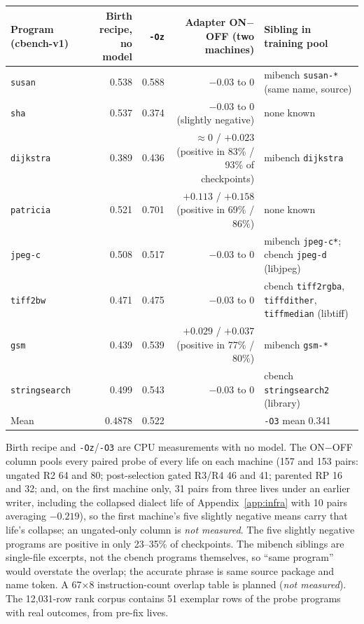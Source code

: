 \documentclass{article}
\newcommand{\onoff}{ON$-$OFF}
\newcommand{\nm}{\emph{not measured}}
\begin{document}
\begin{center}\small
\begin{tabular}{lrrrl}
\toprule
Program (cbench-v1) & Birth recipe, no model & \texttt{-Oz} & Adapter \onoff{} (two machines) & Sibling in training pool \\
\midrule
\texttt{susan} & 0.538 & 0.588 & $-0.03$ to 0 & mibench \texttt{susan-*} (same name, source) \\
\texttt{sha} & 0.537 & 0.374 & $-0.03$ to 0 (slightly negative) & none known \\
\texttt{dijkstra} & 0.389 & 0.436 & $\approx 0$ / $+0.023$ (positive in 83\% / 93\% of checkpoints) & mibench \texttt{dijkstra} \\
\texttt{patricia} & 0.521 & 0.701 & $+0.113$ / $+0.158$ (positive in 69\% / 86\%) & none known \\
\texttt{jpeg-c} & 0.508 & 0.517 & $-0.03$ to 0 & mibench \texttt{jpeg-c*}; cbench \texttt{jpeg-d} (libjpeg) \\
\texttt{tiff2bw} & 0.471 & 0.475 & $-0.03$ to 0 & cbench \texttt{tiff2rgba}, \texttt{tiffdither}, \texttt{tiffmedian} (libtiff) \\
\texttt{gsm} & 0.439 & 0.539 & $+0.029$ / $+0.037$ (positive in 77\% / 80\%) & mibench \texttt{gsm-*} \\
\texttt{stringsearch} & 0.499 & 0.543 & $-0.03$ to 0 & cbench \texttt{stringsearch2} (library) \\
\midrule
Mean & 0.4878 & 0.522 & & \texttt{-O3} mean 0.341 \\
\bottomrule
\end{tabular}
\end{center}
Birth recipe and \texttt{-Oz}/\texttt{-O3} are CPU measurements with no model. The \onoff{} column pools every paired probe of every life on each machine (157 and 153 pairs: ungated R2 64 and 80; post-selection gated R3/R4 46 and 41; parented RP 16 and 32; and, on the first machine only, 31 pairs from three lives under an earlier writer, including the collapsed dialect life of Appendix~\ref{app:infra} with 10 pairs averaging $-0.219$), so the first machine's five slightly negative means carry that life's collapse; an ungated-only column is \nm. The five slightly negative programs are positive in only 23--35\% of checkpoints. The mibench siblings are single-file excerpts, not the cbench programs themselves, so ``same program'' would overstate the overlap; the accurate phrase is same source package and name token. A 67$\times$8 instruction-count overlap table is planned (\nm). The 12{,}031-row rank corpus contains 51 exemplar rows of the probe programs with real outcomes, from pre-fix lives.
\end{document}

